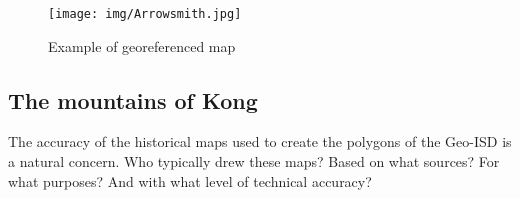 \documentclass[12pt]{article}
\begin{document}
% 



\begin{figure}[h!tpb]
	\centering
	\texttt{[image: img/Arrowsmith.jpg]}
	\caption{Example of georeferenced map}%
	\label{Arrowsmith}
\end{figure}


\subsection{The mountains of Kong}

The accuracy of the historical maps used to create the polygons of the Geo-ISD
is a natural concern. Who typically drew these maps? Based on what sources? For
what purposes? And with what level of technical accuracy? 
\end{document}
